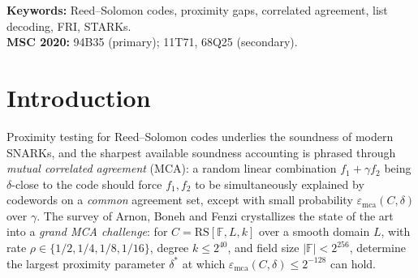 \documentclass[11pt]{article}
\theoremstyle{definition}
\theoremstyle{remark}
\newcommand{\F}{\mathbb{F}}
\newcommand{\B}{\mathbb{B}}
\newcommand{\RS}{\mathrm{RS}}
\newcommand{\emca}{\varepsilon_{\mathrm{mca}}}
\begin{document}
\begin{abstract}
The remaining safe-side work is organized as a conditional certificate template rather than a proved three-inequality closure.  Its candidate buckets are structured quotient/prefix pullbacks, a base-field-normalized interior split-pencil census, and local primitive shift-pair control.  The interior normalization keeps the pigeonhole ceiling before multiplying by the number of size-$m$ supports: the unavoidable discrete floor is distinct from the smooth mean-plus-one upper model.  Finite adjacent rows require the \emph{sum} of every paid and residual numerator to fit inside one row budget.  In the asymptotic reserve regime a loss $L(n)$ is absorbable only when $R(n)\to\infty$, $R(n)=o(n)$, and $\log L(n)=o(R(n)\log|\B|)$; polynomial loss is therefore absorbed by $R\gg\log n$, while a generic $e^{o(n)}$ loss is not automatically absorbed.  All unconditional deployed-row verdicts carry exact integer certificates; the adjacent safe rows remain explicitly conditional on a complete coverage-and-coalescing certificate.
\end{abstract}

\medskip
\noindent\textbf{Keywords:} Reed--Solomon codes, proximity gaps, correlated agreement, list decoding, FRI, STARKs.\\
\textbf{MSC 2020:} 94B35 (primary); 11T71, 68Q25 (secondary).

{\small\setcounter{tocdepth}{2}\tableofcontents}

\section{Introduction}\label{sec:intro}

Proximity testing for Reed--Solomon codes underlies the soundness of modern SNARKs, and the sharpest available soundness accounting is phrased through \emph{mutual correlated agreement} (MCA): a random linear combination $f_1+\gamma f_2$ being $\delta$-close to the code should force $f_1,f_2$ to be simultaneously explained by codewords on a \emph{common} agreement set, except with small probability $\emca(C,\delta)$ over $\gamma$. The survey of Arnon, Boneh and Fenzi \cite{ABF26} crystallizes the state of the art into a \emph{grand MCA challenge}: for $C=\RS[\F,L,k]$ over a smooth domain $L$, with rate $\rho\in\{1/2,1/4,1/8,1/16\}$, degree $k\le2^{40}$, and field size $|\F|<2^{256}$, determine the largest proximity parameter $\delta^*$ at which $\emca(C,\delta)\le2^{-128}$ can hold.
\end{document}
